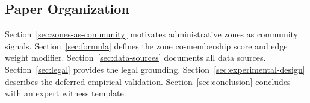\subsection{Paper Organization}

Section~\ref{sec:zones-as-community} motivates administrative zones as community
signals.
Section~\ref{sec:formula} defines the zone co-membership score and edge weight modifier.
Section~\ref{sec:data-sources} documents all data sources.
Section~\ref{sec:legal} provides the legal grounding.
Section~\ref{sec:experimental-design} describes the deferred empirical validation.
Section~\ref{sec:conclusion} concludes with an expert witness template.
